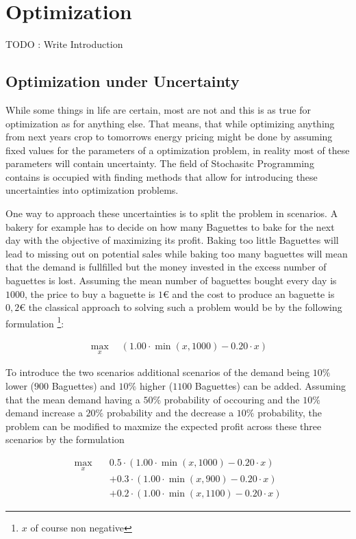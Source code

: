
\chapter{Optimization}\label{section:optimization}

TODO : Write Introduction

\section{Optimization under Uncertainty}

While some things in life are certain, most are not and this is as true for optimization as for anything else. That means, that while optimizing anything from next years crop to tomorrows energy pricing might be done by assuming fixed values for the parameters of a optimization problem, in reality most of these parameters will contain uncertainty. The field of Stochasitc Programming contains is occupied with finding methods that allow for introducing these uncertainties into optimization problems.

One way to approach these uncertainties is to split the problem in scenarios. A bakery for example has to decide on how many Baguettes to bake for the next day with the objective of maximizing its profit. Baking too little Baguettes will lead to missing out on potential sales while baking too many baguettes will mean that the demand is fullfilled but the money invested in the excess number of baguettes is lost. Assuming the mean number of baguettes bought every day is $1000$, the price to buy a baguette is $1 €$ and the cost to produce an baguette is $0,2 €$ the classical approach to solving such a problem would be by the following formulation \footnote{$x$ of course non negative}: 


\begin{align*}
	\max_{x} \quad \left( 1.00 \cdot \min(x,1000) - 0.20 \cdot x \right)
\end{align*}


To introduce the two scenarios additional scenarios of the demand being $10\%$ lower ($900$ Baguettes) and $10\%$ higher ($1100$ Baguettes) can be added. Assuming that the mean demand having a $50\%$ probability of occouring and the $10\%$ demand increase a $20\%$ probability and the decrease a $10\%$  probability, the problem can be modified to maxmize the expected profit across these three scenarios by the formulation

\begin{align*}
	\max_{x} \quad & 0.5 \cdot \left(1.00 \cdot \min(x,1000) - 0.20 \cdot x \right) \\
	&+ 0.3 \cdot \left(1.00 \cdot \min(x,900) - 0.20 \cdot x\right) \\
	&+ 0.2 \cdot \left(1.00 \cdot \min(x,1100) - 0.20 \cdot x\right)
\end{align*}

